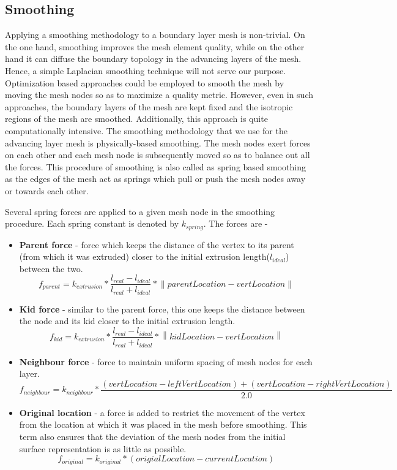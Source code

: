 \documentclass[conf]{new-aiaa}
\newcommand{\norm}[1]{\left\lVert#1\right\rVert}
\begin{document}
\subsection{Smoothing}

Applying a smoothing methodology to a boundary layer mesh is non-trivial. On the one hand, smoothing improves the mesh element quality, while on the other hand it can diffuse the boundary topology in the advancing layers of the mesh. Hence, a simple Laplacian smoothing technique will not serve our purpose. Optimization based approaches could be employed to smooth the mesh by moving the mesh nodes so as to maximize a quality metric\cite{canann1998approach}. However, even in such approaches, the boundary layers of the mesh are kept fixed and the isotropic regions of the mesh are smoothed. Additionally, this approach is quite computationally intensive. The smoothing methodology that we use for the advancing layer mesh is physically-based smoothing. The mesh nodes exert forces on each other and each mesh node is subsequently moved so as to balance out all the forces. This procedure of smoothing is also called as spring based smoothing as the edges of the mesh act as springs which pull or push the mesh nodes away or towards each other.

Several spring forces are applied to a given mesh node in the smoothing procedure. Each spring constant is denoted by $k_{spring}$. The forces are -

\begin{itemize}
\item \textbf{Parent force} - force which keeps the distance of the vertex to its parent (from which it was extruded) closer to the initial extrusion length($l_{ideal}$) between the two.
\begin{equation}
f_{parent} = k_{extrusion} * \frac{l_{real} - l_{ideal}}{l_{real} + l_{ideal}} * \norm{parentLocation - vertLocation}
\end{equation}
\item \textbf{Kid force} - similar to the parent force, this one keeps the distance between the node and its kid closer to the initial extrusion length.
\begin{equation}
f_{kid} = k_{extrusion} * \frac{l_{real} - l_{ideal}}{l_{real} + l_{ideal}} * \norm{kidLocation - vertLocation}
\end{equation}
\item \textbf{Neighbour force} - force to maintain uniform spacing of mesh nodes for each layer.
\begin{equation}
f_{neighbour} = k_{neighbour} * \frac{(vertLocation - leftVertLocation) + (vertLocation - rightVertLocation)}{ 2.0}
\end{equation}
\item \textbf{Original location} - a force is added to restrict the movement of the vertex from the location at which it was placed in the mesh before smoothing. This term also ensures that the deviation of the mesh nodes from the initial surface representation is as little as possible.
\begin{equation}
f_{original} = k_{original} * (origialLocation - currentLocation)
\end{equation}
\end{itemize}
\end{document}
